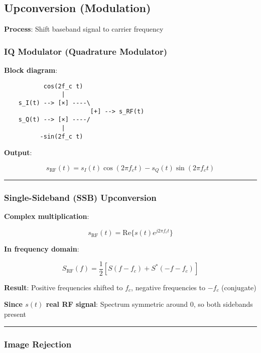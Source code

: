 \subsection{Upconversion (Modulation)}\label{upconversion-modulation}

\textbf{Process}: Shift baseband signal to carrier frequency

\subsubsection{IQ Modulator (Quadrature
Modulator)}\label{iq-modulator-quadrature-modulator}

\textbf{Block diagram}:

\begin{verbatim}
           cos(2f_c t)
                |
    s_I(t) --> [×] ----\
                        [+] --> s_RF(t)
    s_Q(t) --> [×] ----/
                |
          -sin(2f_c t)
\end{verbatim}

\textbf{Output}:

\[
s_{\text{RF}}(t) = s_I(t) \cos(2\pi f_c t) - s_Q(t) \sin(2\pi f_c t)
\]

\begin{center}\rule{0.5\linewidth}{0.5pt}\end{center}

\subsubsection{Single-Sideband (SSB)
Upconversion}\label{single-sideband-ssb-upconversion}

\textbf{Complex multiplication}:

\[
s_{\text{RF}}(t) = \text{Re}\{s(t) e^{j2\pi f_c t}\}
\]

\textbf{In frequency domain}:

\[
S_{\text{RF}}(f) = \frac{1}{2}[S(f - f_c) + S^*(-f - f_c)]
\]

\textbf{Result}: Positive frequencies shifted to \(f_c\), negative
frequencies to \(-f_c\) (conjugate)

\textbf{Since \(s(t)\) real RF signal}: Spectrum symmetric around 0, so
both sidebands present

\begin{center}\rule{0.5\linewidth}{0.5pt}\end{center}

\subsubsection{Image Rejection}\label{image-rejection}

